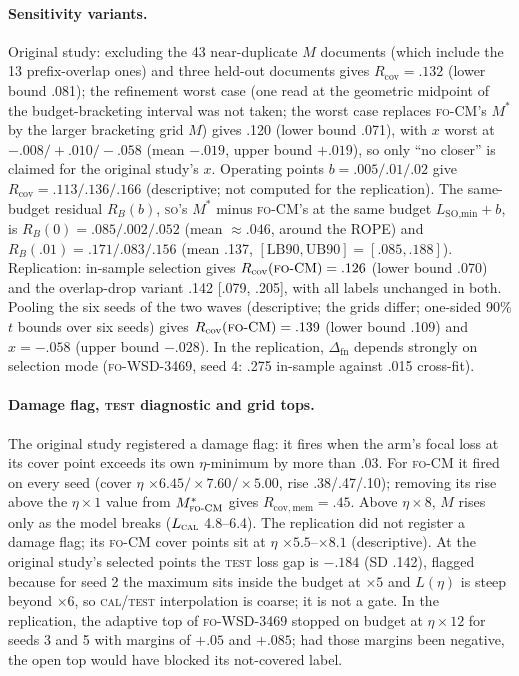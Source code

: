 \documentclass[11pt]{article}
\newcommand{\FO}{\textsc{fo}}
\newcommand{\SO}{\textsc{so}}
\newcommand{\Mstar}{\ensuremath{M^{\ast}}}
\newcommand{\Rcov}{\ensuremath{R_{\mathrm{cov}}}}
\newcommand{\Rcovmem}{\ensuremath{R_{\mathrm{cov,mem}}}}
\newcommand{\LB}{\ensuremath{\mathrm{LB90}}}
\newcommand{\UB}{\ensuremath{\mathrm{UB90}}}
\begin{document}
\paragraph{Sensitivity variants.} Original study: excluding the 43
near-duplicate $M$ documents (which include the 13 prefix-overlap ones) and three held-out documents gives $\Rcov=.132$ (lower bound .081); the
refinement worst case (one read at the geometric midpoint of the budget-bracketing interval was not
taken; the worst case replaces \FO-CM's $\Mstar$ by the larger bracketing grid $M$) gives .120 (lower
bound .071), with $x$ worst at $-.008/+.010/-.058$ (mean $-.019$, upper bound $+.019$), so only ``no
closer'' is claimed for the original study's $x$. Operating points $b=.005/.01/.02$ give
$\Rcov=.113/.136/.166$ (descriptive; not computed for the replication). The same-budget residual $R_B(b)$, \SO's $\Mstar$ minus
\FO-CM's at the same budget $L_{\text{SO,min}}+b$, is $R_B(0)=.085/.002/.052$ (mean $\approx.046$,
around the ROPE) and $R_B(.01)=.171/.083/.156$ (mean .137, $[\LB,\UB]=[.085,.188]$). Replication:
in-sample selection gives $\Rcov(\FO\text{-CM})=.126$ (lower bound .070) and the overlap-drop variant
.142 [.079, .205], with all labels unchanged in both. Pooling the six seeds of the two waves
(descriptive; the grids differ; one-sided 90\% $t$ bounds over six seeds) gives
$\Rcov(\FO\text{-CM})=.139$ (lower bound .109) and $x=-.058$ (upper bound $-.028$). In the replication, $\Delta_{\text{fn}}$ depends strongly on selection mode
(\FO-WSD-3469, seed 4: .275 in-sample against .015 cross-fit).

\paragraph{Damage flag, \textsc{test} diagnostic and grid tops.} The original study registered a
damage flag: it fires when the arm's focal loss at its cover point exceeds its own $\eta$-minimum by
more than .03. For \FO-CM{} it fired on every seed (cover $\eta$ $\times6.45/\times7.60/\times5.00$,
rise .38/.47/.10); removing its rise above the $\eta\times1$ value from $\Mstar_{\FO\text{-CM}}$ gives $\Rcovmem=.45$. Above
$\eta\times8$, $M$ rises only as the model breaks ($L_{\textsc{cal}}$ 4.8--6.4). The replication did not
register a damage flag; its \FO-CM{} cover points sit at $\eta$ $\times5.5$--$\times8.1$
(descriptive). At the original study's selected points the \textsc{test} loss gap is
$-.184$ (SD .142), flagged because for seed 2 the maximum sits inside the budget at $\times5$ and
$L(\eta)$ is steep beyond $\times6$, so \textsc{cal}/\textsc{test} interpolation is coarse; it is not a
gate. In the replication, the adaptive top of \FO-WSD-3469 stopped on budget at $\eta\times12$ for seeds
3 and 5 with margins of $+.05$ and $+.085$; had those margins been negative, the open top would have
blocked its not-covered label.
\end{document}
